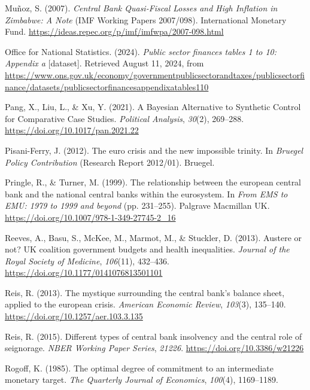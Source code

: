 \documentclass[
  a4paper,
  abstract=true]{scrartcl}
\newlength{\cslhangindent}
\newenvironment{CSLReferences}[2] %
 {\begin{list}{}{%
  \setlength{\itemindent}{0pt}
  \setlength{\leftmargin}{0pt}
  \setlength{\parsep}{0pt}
  \ifodd #1
   \setlength{\leftmargin}{\cslhangindent}
   \setlength{\itemindent}{-1\cslhangindent}
  \fi
  \setlength{\itemsep}{#2\baselineskip}}}
 {\end{list}}
\theoremstyle{definition}
\begin{document}
\begin{CSLReferences}{1}{0}
Muñoz, S. (2007). \emph{{Central Bank Quasi-Fiscal Losses and High
Inflation in Zimbabwe: A Note}} (IMF Working Papers 2007/098).
International Monetary Fund.
\url{https://ideas.repec.org/p/imf/imfwpa/2007-098.html}

Office for National Statistics. (2024). \emph{Public sector finances
tables 1 to 10: Appendix a} {[}dataset{]}. Retrieved August 11, 2024,
from
\url{https://www.ons.gov.uk/economy/governmentpublicsectorandtaxes/publicsectorfinance/datasets/publicsectorfinancesappendixatables110}

Pang, X., Liu, L., \& Xu, Y. (2021). A Bayesian Alternative to Synthetic
Control for Comparative Case Studies. \emph{Political Analysis},
\emph{30}(2), 269--288. \url{https://doi.org/10.1017/pan.2021.22}

Pisani-Ferry, J. (2012). The euro crisis and the new impossible trinity.
In \emph{Bruegel Policy Contribution} (Research Report 2012/01).
Bruegel.

Pringle, R., \& Turner, M. (1999). The relationship between the european
central bank and the national central banks within the eurosystem. In
\emph{From EMS to EMU: 1979 to 1999 and beyond} (pp. 231--255). Palgrave
Macmillan UK. \url{https://doi.org/10.1007/978-1-349-27745-2_16}

Reeves, A., Basu, S., McKee, M., Marmot, M., \& Stuckler, D. (2013).
Austere or not? UK coalition government budgets and health inequalities.
\emph{Journal of the Royal Society of Medicine}, \emph{106}(11),
432--436. \url{https://doi.org/10.1177/0141076813501101}

Reis, R. (2013). The mystique surrounding the central bank's balance
sheet, applied to the european crisis. \emph{American Economic Review},
\emph{103}(3), 135--140. \url{https://doi.org/10.1257/aer.103.3.135}

Reis, R. (2015). Different types of central bank insolvency and the
central role of seignorage. \emph{NBER Working Paper Series},
\emph{21226}. \url{https://doi.org/10.3386/w21226}

Rogoff, K. (1985). The optimal degree of commitment to an intermediate
monetary target. \emph{The Quarterly Journal of Economics},
\emph{100}(4), 1169--1189.


\end{CSLReferences}
\end{document}
